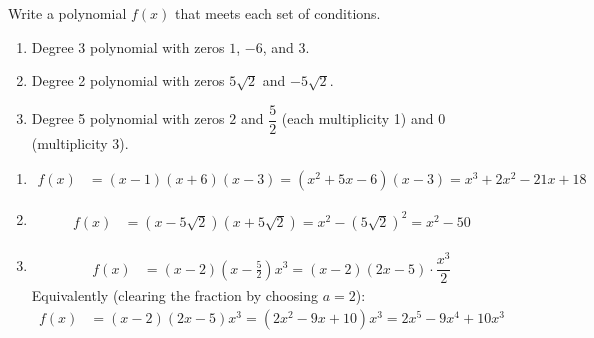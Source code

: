 \documentclass{ximera}
\begin{document}
\begin{problem}
Write a polynomial $f(x)$ that meets each set of conditions.
\begin{enumerate}
  \item[(a)] Degree 3 polynomial with zeros $1$, $-6$, and $3$.
  \medskip
  \item[(b)] Degree 2 polynomial with zeros $5\sqrt{2}$ and $-5\sqrt{2}$.
  \medskip
  \item[(c)] Degree 5 polynomial with zeros $2$ and $\dfrac{5}{2}$ (each multiplicity 1) and $0$ (multiplicity 3).
\end{enumerate}

\begin{solution}
\begin{enumerate}
  \item[(a)]
  \begin{align*}
    f(x) &= (x-1)(x+6)(x-3) = (x^2+5x-6)(x-3) = x^3+2x^2-21x+18
  \end{align*}

  \item[(b)]
  \begin{align*}
    f(x) &= (x-5\sqrt{2})(x+5\sqrt{2}) = x^2-(5\sqrt{2})^2 = x^2-50
  \end{align*}

  \item[(c)]
  \begin{align*}
    f(x) &= (x-2)\!\left(x-\tfrac{5}{2}\right)x^3 = (x-2)(2x-5)\cdot\dfrac{x^3}{2}
  \end{align*}
  Equivalently (clearing the fraction by choosing $a=2$):
  \begin{align*}
    f(x) &= (x-2)(2x-5)x^3 = (2x^2-9x+10)x^3 = 2x^5-9x^4+10x^3
  \end{align*}
\end{enumerate}
\end{solution}
\end{problem}
\end{document}
